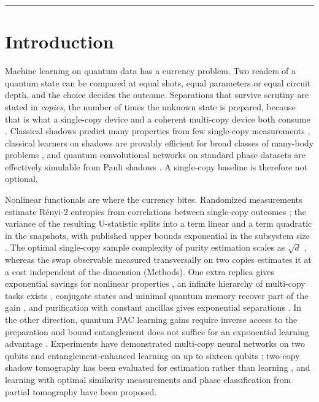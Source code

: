 \documentclass[11pt,a4paper]{article}
\begin{document}
\hrule
\vspace{0.6em}

\section{Introduction}

Machine learning on quantum data has a currency problem. Two readers of a quantum state can be
compared at equal shots, equal parameters or equal circuit depth, and the choice decides the
outcome. Separations that survive scrutiny are stated in \emph{copies}, the number of times the
unknown state is prepared, because that is what a single-copy device and a coherent multi-copy
device both consume \citep{huang2021advantage,isogai2026pac}. Classical shadows predict many
properties from few single-copy measurements \citep{huang2020predicting}, classical learners on
shadows are provably efficient for broad classes of many-body problems \citep{huang2021provably},
and quantum convolutional networks on standard phase datasets are effectively simulable from Pauli
shadows \citep{bermejo2024qcnn}. A single-copy baseline is therefore not optional.

Nonlinear functionals are where the currency bites. Randomized measurements estimate R\'enyi-2
entropies from correlations between single-copy outcomes
\citep{brydges2019probing,elben2019statistical,elben2022toolbox}; the variance of the resulting
U-statistic splits into a term linear and a term quadratic in the snapshots, with published upper
bounds exponential in the subsystem size \citep{elben2020mixed}. The optimal single-copy sample
complexity of purity estimation scales as $\sqrt d$ \citep{gong2024purity,liu2026moments}, whereas
the swap observable measured transversally on two copies estimates it at a cost independent of the
dimension (Methods). One extra replica gives exponential savings for nonlinear properties
\citep{ye2025replica}, an infinite hierarchy of multi-copy tasks exists \citep{noeller2025hierarchy},
conjugate states and minimal quantum memory recover part of the gain \citep{king2024conjugate}, and
purification with constant ancillas gives exponential separations \citep{liu2024purification}. In
the other direction, quantum PAC learning gains require inverse access to the preparation
\citep{isogai2026pac} and bound entanglement does not suffice for an exponential learning advantage
\citep{kang2026bound}. Experiments have demonstrated multi-copy neural networks on two qubits
\citep{tulewicz2024multicopy} and entanglement-enhanced learning on up to sixteen qubits
\citep{seif2024entanglement}; two-copy shadow tomography has been evaluated for estimation rather
than learning \citep{tran2025two}, and learning with optimal similarity measurements
\citep{li2026similarity} and phase classification from partial tomography \citep{tanji2025phase}
have been proposed.
\end{document}
